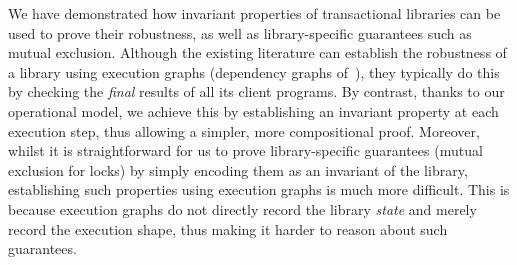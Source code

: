 We have demonstrated how invariant properties of transactional libraries can be used to prove their robustness, as well as  library-specific guarantees such as mutual exclusion. 
Although the existing literature can establish the robustness of a library using execution graphs (\eg dependency graphs of~\cite{adya}), they typically do this by checking the \emph{final} results of all its client programs.
By contrast, thanks to our operational model, we achieve this by establishing an invariant property at each execution step, thus allowing a simpler, more compositional proof. 
Moreover, whilst it is straightforward for us to prove library-specific guarantees (\eg mutual exclusion for locks) by simply encoding them as an invariant of the library, 
establishing such properties using execution graphs is much more difficult. 
This is because execution graphs do not directly record the library \emph{state} and merely record the execution shape, thus making it harder to reason about such guarantees.
